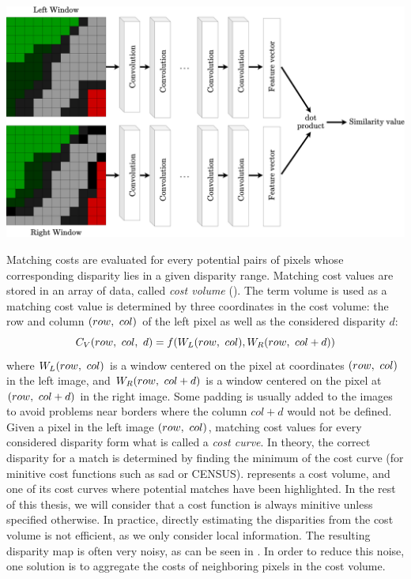 \begin{example}
	{\centering\includegraphics[width=0.8\linewidth]{Images/Chap_1/MCCNN.png}\label{fig:mccnn}}
\end{example}

Matching costs are evaluated for every potential pairs of pixels whose corresponding disparity lies in a given disparity range. Matching cost values are stored in an array of data, called \textit{cost volume} (). The term volume is used as a matching cost value is determined by three coordinates in the cost volume: the row and column $(row, ~col)$ of the left pixel as well as the considered disparity $d$:
\begin{equation}\label{eq:cost_volume}
    C_V(row, ~col, ~d) = f(W_L(row, ~col),  W_R(row, ~col+d))
\end{equation}
where $W_L(row, ~col)$ is a window centered on the pixel at coordinates $(row, ~col)$ in the left image, and $W_R(row, ~col+d)$ is a window centered on the pixel at $(row, ~col+d)$ in the right image. Some padding is usually added to the images to avoid problems near borders where the column $col+d$ would not be defined. Given a pixel in the left image $(row, ~col)$, matching cost values for every considered disparity form what is called a \textit{cost curve}. In theory, the correct disparity for a match is determined by finding the minimum of the cost curve (for minitive cost functions such as \acrshort{sad} or CENSUS).  represents a cost volume, and one of its cost curves where potential matches have been highlighted. In the rest of this thesis, we will consider that a cost function is always minitive unless specified otherwise. In practice, directly estimating the disparities from the cost volume is not efficient, as we only consider local information. The resulting disparity map is often very noisy, as can be seen in . In order to reduce this noise, one solution is to aggregate the costs of neighboring pixels in the cost volume.

